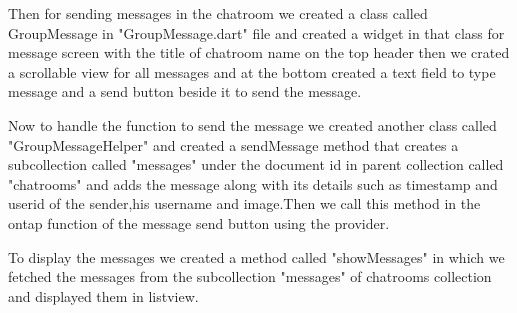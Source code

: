 Then for sending messages in the chatroom we created a class called GroupMessage in "GroupMessage.dart" file and created a widget in that class for message screen with the title of chatroom name on the top header then we crated a scrollable view for all messages and at the bottom created a text field to type message and a send button beside it to send the message.

Now to handle the function to send the message we created another class called "GroupMessageHelper" and created a sendMessage method that creates a subcollection called "messages" under the document id in parent collection called "chatrooms" and adds the message along with its details such as timestamp and userid of the sender,his username and image.Then we call this method in the ontap function of the message send button using the provider.

To display the messages we created a method called "showMessages" in which we fetched the messages from the subcollection "messages" of chatrooms collection and displayed them in listview.


